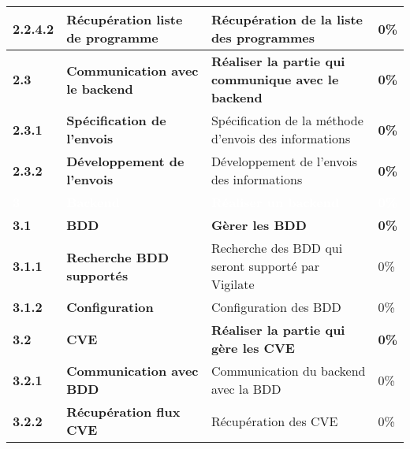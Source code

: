 \begin{supertabular}{|p{2.8cm} p{6cm}|p{5cm}|R{2cm}|}
  \hspace{12pt}
  \textbf{2.2.4.2}  & \textbf{Récupération liste de programme} & Récupération de la liste des programmes & 0\% \\
  \hline

  \textbf{2.3}  & \textbf{Communication avec le backend} & \textbf{Réaliser la partie qui communique avec le backend} & \textbf{0\%} \\
  \hline

  \hspace{6pt}
  \textbf{2.3.1}  & \textbf{Spécification de l'envois} & Spécification de la méthode d'envois des informations & \textbf{0\%} \\
  \hline

  \hspace{6pt}
  \textbf{2.3.2}  & \textbf{Développement de l'envois} & Développement de l'envois des informations & \textbf{0\%} \\
  \hline



  \textcolor{white}{\textbf{3}}  & \textcolor{white}{\textbf{Backend}} & \textcolor{white}{\textbf{Réaliser un backend}} & \textcolor{white}{\textbf{0\%}} \\
  \hline

  \textbf{3.1}  & \textbf{BDD} & \textbf{Gèrer les BDD} & \textbf{0\%} \\
  \hline

  \hspace{6pt}
  \textbf{3.1.1}  & \textbf{Recherche BDD supportés} & Recherche des BDD qui seront supporté par Vigilate & 0\% \\
  \hline

  \hspace{6pt}
  \textbf{3.1.2}  & \textbf{Configuration} & Configuration des BDD & 0\% \\
  \hline


  \textbf{3.2}  & \textbf{CVE} & \textbf{Réaliser la partie qui gère les CVE} & \textbf{0\%} \\
  \hline

  \hspace{6pt}
  \textbf{3.2.1}  & \textbf{Communication avec BDD} & Communication du backend avec la BDD  & 0\% \\
  \hline

  \hspace{6pt}
  \textbf{3.2.2}  & \textbf{Récupération flux CVE} & Récupération des CVE & 0\% \\
  \hline


\end{supertabular}
